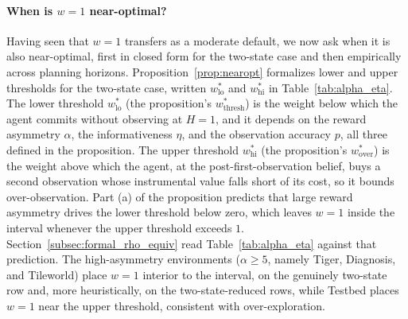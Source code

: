 \paragraph{When is $w{=}1$ near-optimal?}
Having seen that $w{=}1$ transfers as a moderate default, we now ask when it is also near-optimal, first in closed form for the two-state case and then empirically across planning horizons. Proposition~\ref{prop:nearopt} formalizes lower and upper thresholds for the two-state case, written $w^*_{\mathrm{lo}}$ and $w^*_{\mathrm{hi}}$ in Table~\ref{tab:alpha_eta}. The lower threshold $w^*_{\mathrm{lo}}$ (the proposition's $w^*_{\mathrm{thresh}}$) is the weight below which the agent commits without observing at $H{=}1$, and it depends on the reward asymmetry $\alpha$, the informativeness $\eta$, and the observation accuracy $p$, all three defined in the proposition. The upper threshold $w^*_{\mathrm{hi}}$ (the proposition's $w^*_{\mathrm{over}}$) is the weight above which the agent, at the post-first-observation belief, buys a second observation whose instrumental value falls short of its cost, so it bounds over-observation. Part (a) of the proposition predicts that large reward asymmetry drives the lower threshold below zero, which leaves $w{=}1$ inside the interval whenever the upper threshold exceeds $1$. Section~\ref{subsec:formal_rho_equiv} read Table~\ref{tab:alpha_eta} against that prediction. The high-asymmetry environments ($\alpha \geq 5$, namely Tiger, Diagnosis, and Tileworld) place $w{=}1$ interior to the interval, on the genuinely two-state row and, more heuristically, on the two-state-reduced rows, while Testbed places $w{=}1$ near the upper threshold, consistent with over-exploration.

